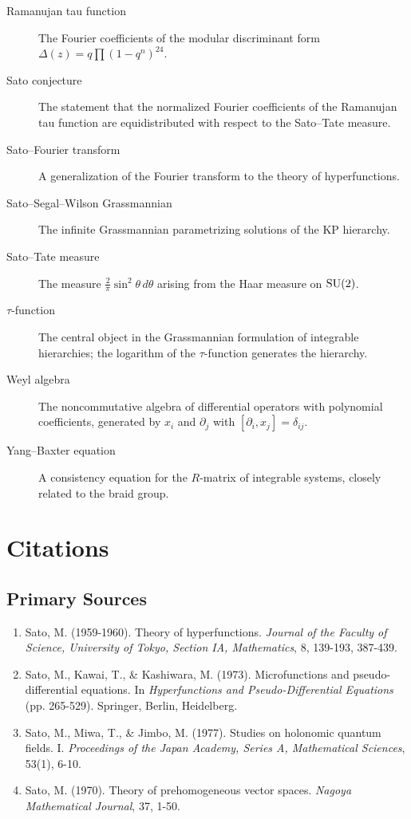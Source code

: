 \begin{description}
    \item[Ramanujan tau function] The Fourier coefficients of the modular discriminant form \(\Delta(z) = q \prod (1-q^n)^{24}\).
    \item[Sato conjecture] The statement that the normalized Fourier coefficients of the Ramanujan tau function are equidistributed with respect to the Sato--Tate measure.
    \item[Sato--Fourier transform] A generalization of the Fourier transform to the theory of hyperfunctions.
    \item[Sato--Segal--Wilson Grassmannian] The infinite Grassmannian parametrizing solutions of the KP hierarchy.
    \item[Sato--Tate measure] The measure \(\frac{2}{\pi} \sin^2 \theta \, d\theta\) arising from the Haar measure on \(\operatorname{SU}(2)\).
    \item[\(\tau\)-function] The central object in the Grassmannian formulation of integrable hierarchies; the logarithm of the \(\tau\)-function generates the hierarchy.
    \item[Weyl algebra] The noncommutative algebra of differential operators with polynomial coefficients, generated by \(x_i\) and \(\partial_j\) with \([\partial_i, x_j] = \delta_{ij}\).
    \item[Yang--Baxter equation] A consistency equation for the \(R\)-matrix of integrable systems, closely related to the braid group.
\end{description}

\section{Citations}

\subsection*{Primary Sources}
\begin{enumerate}
    \item Sato, M. (1959-1960). Theory of hyperfunctions. \textit{Journal of the Faculty of Science, University of Tokyo, Section IA, Mathematics}, 8, 139-193, 387-439.
    \item Sato, M., Kawai, T., \& Kashiwara, M. (1973). Microfunctions and pseudo-differential equations. In \textit{Hyperfunctions and Pseudo-Differential Equations} (pp. 265-529). Springer, Berlin, Heidelberg.
    \item Sato, M., Miwa, T., \& Jimbo, M. (1977). Studies on holonomic quantum fields. I. \textit{Proceedings of the Japan Academy, Series A, Mathematical Sciences}, 53(1), 6-10.
    \item Sato, M. (1970). Theory of prehomogeneous vector spaces. \textit{Nagoya Mathematical Journal}, 37, 1-50.
\end{enumerate}


